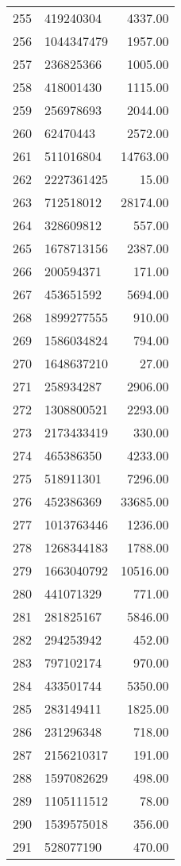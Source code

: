 \begin{table}[ht]
\begin{tabular}{rlr}
  255 & 419240304 & 4337.00 \\ 
  256 & 1044347479 & 1957.00 \\ 
  257 & 236825366 & 1005.00 \\ 
  258 & 418001430 & 1115.00 \\ 
  259 & 256978693 & 2044.00 \\ 
  260 & 62470443 & 2572.00 \\ 
  261 & 511016804 & 14763.00 \\ 
  262 & 2227361425 & 15.00 \\ 
  263 & 712518012 & 28174.00 \\ 
  264 & 328609812 & 557.00 \\ 
  265 & 1678713156 & 2387.00 \\ 
  266 & 200594371 & 171.00 \\ 
  267 & 453651592 & 5694.00 \\ 
  268 & 1899277555 & 910.00 \\ 
  269 & 1586034824 & 794.00 \\ 
  270 & 1648637210 & 27.00 \\ 
  271 & 258934287 & 2906.00 \\ 
  272 & 1308800521 & 2293.00 \\ 
  273 & 2173433419 & 330.00 \\ 
  274 & 465386350 & 4233.00 \\ 
  275 & 518911301 & 7296.00 \\ 
  276 & 452386369 & 33685.00 \\ 
  277 & 1013763446 & 1236.00 \\ 
  278 & 1268344183 & 1788.00 \\ 
  279 & 1663040792 & 10516.00 \\ 
  280 & 441071329 & 771.00 \\ 
  281 & 281825167 & 5846.00 \\ 
  282 & 294253942 & 452.00 \\ 
  283 & 797102174 & 970.00 \\ 
  284 & 433501744 & 5350.00 \\ 
  285 & 283149411 & 1825.00 \\ 
  286 & 231296348 & 718.00 \\ 
  287 & 2156210317 & 191.00 \\ 
  288 & 1597082629 & 498.00 \\ 
  289 & 1105111512 & 78.00 \\ 
  290 & 1539575018 & 356.00 \\ 
  291 & 528077190 & 470.00 \\ 

\end{tabular}
\end{table}
